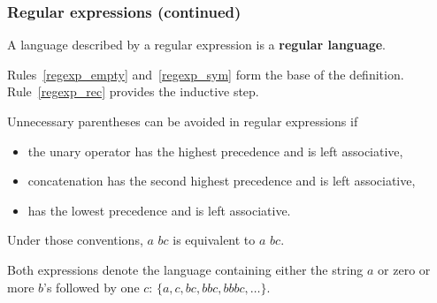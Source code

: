 %
\begin{frame}
\frametitle{Regular expressions (continued)}

A language described by a regular expression is a \textbf{regular
language}.

\bigskip

Rules~\ref{regexp_empty} and~\ref{regexp_sym} form the base of the
definition. Rule~\ref{regexp_rec} provides the inductive step.

\bigskip

Unnecessary parentheses can be avoided in regular expressions if
\begin{itemize}

  \item the unary operator \kleene{} has the highest precedence and
  is left associative,

  \item concatenation has the second highest precedence and is left
  associative,

  \item \disj{} has the lowest precedence and is left associative.

\end{itemize}
Under those conventions, \lparen\(a\)\rparen{} \disj
\lparen\lparen\(b\)\rparen\kleene\lparen\(c\)\rparen\rparen{} is
equivalent to \(a\) \disj \(b\)\kleene\(c\).

\bigskip

Both expressions denote the language containing either the string
\(a\) or zero or more \(b\)'s followed by one \(c\): \(\{a, c, bc,
bbc, bbbc, \dots\}\).

\end{frame}

